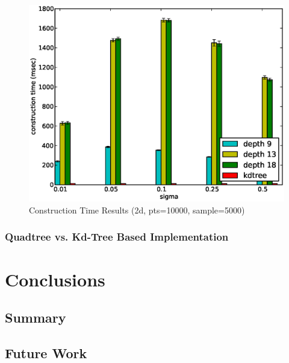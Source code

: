 \documentclass[mcs]{scsthesis}
\begin{document}
\begin{figure}
\begin{center}
\includegraphics[scale=0.5]{diagrams/2d_pts10000_sample5000_ctime.eps}
\caption{Construction Time Results (2d, pts=10000, sample=5000)}
\end{center}
\end{figure}






\subsection{Quadtree vs. Kd-Tree Based Implementation}



\chapter{Conclusions}

\section{Summary}


\section{Future Work}
\end{document}
